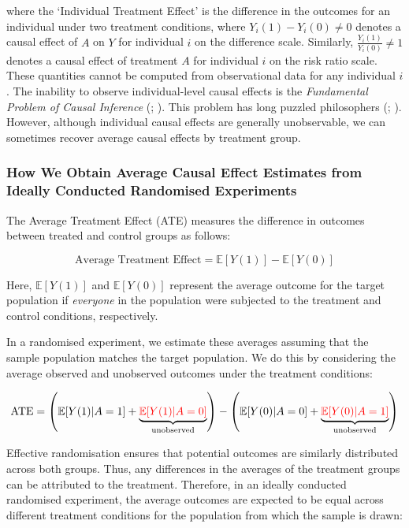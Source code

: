 \documentclass[
  single column]{article}
\begin{document}
where the `Individual Treatment Effect' is the difference in the
outcomes for an individual under two treatment conditions, where
\(Y_i(1) - Y_i(0) \neq 0\) denotes a causal effect of \(A\) on \(Y\) for
individual \(i\) on the difference scale. Similarly,
\(\frac{Y_i(1)}{Y_i(0)} \neq 1\) denotes a causal effect of treatment
\(A\) for individual \(i\) on the risk ratio scale. These quantities
cannot be computed from observational data for any individual \(i\). The
inability to observe individual-level causal effects is the
\emph{Fundamental Problem of Causal Inference}
(;
). This problem has long puzzled
philosophers (;
). However, although individual
causal effects are generally unobservable, we can sometimes recover
average causal effects by treatment group.

\subsubsection{How We Obtain Average Causal Effect Estimates from
Ideally Conducted Randomised
Experiments}\label{how-we-obtain-average-causal-effect-estimates-from-ideally-conducted-randomised-experiments}

The Average Treatment Effect (ATE) measures the difference in outcomes
between treated and control groups as follows:

\[
\text{Average Treatment Effect} = \mathbb{E}[Y(1)] - \mathbb{E}[Y(0)]
\]

Here, \(\mathbb{E}[Y(1)]\) and \(\mathbb{E}[Y(0)]\) represent the
average outcome for the target population if \emph{everyone} in the
population were subjected to the treatment and control conditions,
respectively.

In a randomised experiment, we estimate these averages assuming that the
sample population matches the target population. We do this by
considering the average observed and unobserved outcomes under the
treatment conditions:

\[
\text{ATE} = \left(\mathbb{E}[Y(1) | A = 1] + \underbrace{\textcolor{red}{\mathbb{E}[Y(1) | A = 0]}}_{\text{unobserved}}\right) - \left(\mathbb{E}[Y(0) | A = 0] + \underbrace{\textcolor{red}{\mathbb{E}[Y(0) | A = 1]}}_{\text{unobserved}}\right)
\]

Effective randomisation ensures that potential outcomes are similarly
distributed across both groups. Thus, any differences in the averages of
the treatment groups can be attributed to the treatment. Therefore, in
an ideally conducted randomised experiment, the average outcomes are
expected to be equal across different treatment conditions for the
population from which the sample is drawn:
\end{document}
